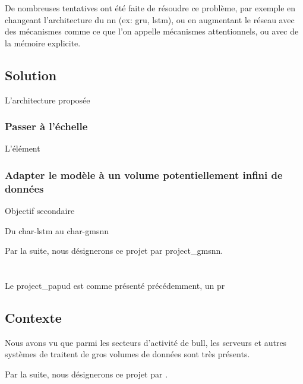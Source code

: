 De nombreuses tentatives ont été faite de résoudre ce problème, par exemple en changeant l'architecture du \gls{nn} (ex: \gls{gru}, \gls{lstm}), ou en augmentant le réseau avec des mécanismes comme ce que l'on appelle mécanismes attentionnels, ou avec de la mémoire explicite.

\subsection*{Solution}
L'architecture proposée 

\subsubsection*{Passer à l'échelle}
L'élément 

\subsubsection*{Adapter le modèle à un volume potentiellement infini de données}
Objectif secondaire

\subsubsectionbreak

Du char-lstm au char-gmsnn




Par la suite, nous désignerons ce projet par \og \gls{project_gmsnn}\fg{}.


\clearpage
\section{\label{sec:projet:papud}}
Le \gls{project_papud} est comme présenté précédemment, un pr

\subsection*{Contexte}
Nous avons vu que parmi les secteurs d'activité de \gls{bull}, les serveurs et autres systèmes de traitent de gros volumes de données sont très présents.




Par la suite, nous désignerons ce projet par \og {}\fg{}.

